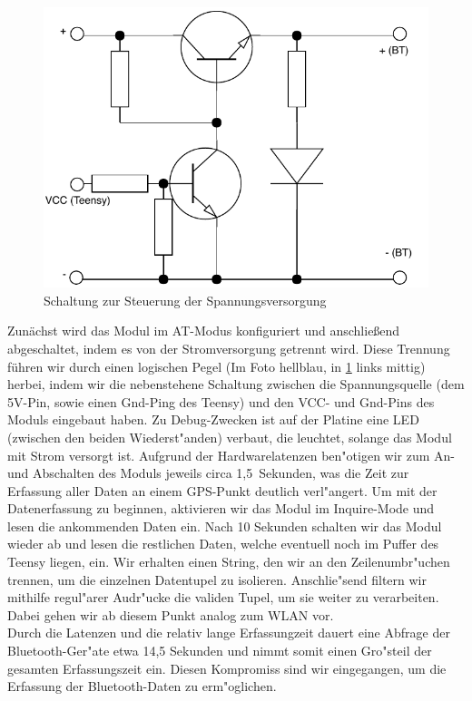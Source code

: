 \documentclass[a4paper,11pt, ngerman]{scrartcl}
\begin{document}
\begin{figure}
	\includegraphics[width=.95\linewidth]{Schaltung.pdf}
	\caption{Schaltung zur Steuerung der Spannungsversorgung}\label{fig:schalt}
\end{figure}
Zunächst wird das Modul im AT-Modus konfiguriert und anschließend abgeschaltet, indem es von der Stromversorgung getrennt wird. Diese Trennung führen wir durch einen logischen Pegel (Im Foto hellblau, in \cref{fig:schalt} links mittig) herbei, indem wir die nebenstehene Schaltung zwischen die Spannungsquelle (dem 5V-Pin, sowie einen Gnd-Ping des Teensy) und den VCC- und Gnd-Pins des Moduls eingebaut haben. Zu Debug-Zwecken ist auf der Platine eine LED (zwischen den beiden Wiederst"anden) verbaut, die leuchtet, solange das Modul mit Strom versorgt ist. Aufgrund der Hardwarelatenzen ben"otigen wir zum An- und Abschalten des Moduls jeweils circa 1,5~Sekunden, was die Zeit zur Erfassung aller Daten an einem GPS-Punkt deutlich verl"angert. Um mit der Datenerfassung zu beginnen, aktivieren wir das Modul im Inquire-Mode und lesen die ankommenden Daten ein. Nach 10 Sekunden schalten wir das Modul wieder ab und lesen die restlichen Daten, welche eventuell noch im Puffer des Teensy liegen, ein. Wir erhalten einen String, den wir an den Zeilenumbr"uchen trennen, um die einzelnen Datentupel zu isolieren. Anschlie"send filtern wir mithilfe regul"arer Audr"ucke die validen Tupel, um sie weiter zu verarbeiten. Dabei gehen wir ab diesem Punkt analog zum WLAN vor.\\
Durch die Latenzen und die relativ lange Erfassungzeit dauert eine Abfrage der Bluetooth-Ger"ate etwa 14,5 Sekunden und nimmt somit einen Gro"steil der gesamten Erfassungszeit ein. Diesen Kompromiss sind wir eingegangen, um die Erfassung der Bluetooth-Daten zu erm"oglichen.\par
\end{document}
